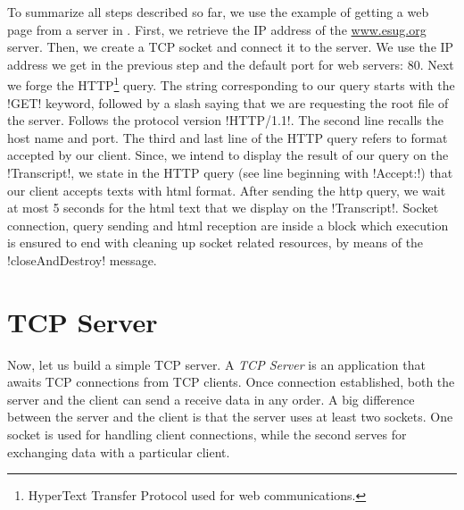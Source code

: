\documentclass[a4paper,10pt,twoside]{book}
\begin{document}
To summarize all steps described so far, we use the example of getting a web page from a server in .
First, we retrieve the IP address of the \url{www.esug.org} server. 
Then, we create a TCP socket and connect it to the server.
We use the IP address we get in the previous step and the default port for web servers: 80.
Next we forge the HTTP\footnote{HyperText Transfer Protocol used for web communications.} query.
The string corresponding  to our query starts with the \ct!GET! keyword, followed by a slash saying that we are requesting the root file of the server.
Follows the protocol version \ct!HTTP/1.1!.
The second line recalls the host name and port.
The third and last line of the HTTP query refers to format accepted by our client. 
Since, we intend to display the result of our query on the \ct!Transcript!, we state in the HTTP query (see line beginning with \ct!Accept:!) that our client accepts texts with html format.
After sending the http query, we wait at most 5 seconds for the html text that we display on the \ct!Transcript!.
Socket connection, query sending and html reception are inside a block which execution is ensured to end with cleaning up socket related resources, by means of the \ct!closeAndDestroy! message.

\section{TCP Server}
\label{sec:serverTcpSocket}
Now, let us build a simple TCP server. A \textit{TCP Server} is an application that awaits TCP connections from TCP clients. Once connection established, both the server and the client can send a receive data in any order. 
A big difference between the server and the client is that the server uses at least two sockets.
One socket is used for handling client connections, while the second serves for exchanging data with a particular client. 

\end{document}
